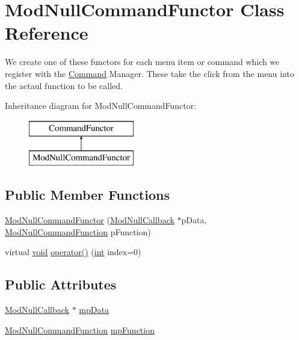 \hypertarget{class_mod_null_command_functor}{}\section{Mod\+Null\+Command\+Functor Class Reference}
\label{class_mod_null_command_functor}


We create one of these functors for each menu item or command which we register with the \hyperlink{class_command}{Command} Manager. These take the click from the menu into the actaul function to be called.  


Inheritance diagram for Mod\+Null\+Command\+Functor\+:\begin{figure}[H]
\begin{center}
\leavevmode
\includegraphics[height=2.000000cm]{class_mod_null_command_functor}
\end{center}
\end{figure}
\subsection*{Public Member Functions}
\begin{DoxyCompactItemize}
\item 
\hyperlink{class_mod_null_command_functor_a516fdbc18c6a0500cc85666d7cd2dd5f}{Mod\+Null\+Command\+Functor} (\hyperlink{class_mod_null_callback}{Mod\+Null\+Callback} $\ast$p\+Data, \hyperlink{_mod_null_callback_8cpp_a2613dba3762740ee26c9868d72c1e54b}{Mod\+Null\+Command\+Function} p\+Function)
\item 
virtual \hyperlink{sound_8c_ae35f5844602719cf66324f4de2a658b3}{void} \hyperlink{class_mod_null_command_functor_a0023affdcbcc704622f2ba172f8dac56}{operator()} (\hyperlink{xmltok_8h_a5a0d4a5641ce434f1d23533f2b2e6653}{int} index=0)
\end{DoxyCompactItemize}
\subsection*{Public Attributes}
\begin{DoxyCompactItemize}
\item 
\hyperlink{class_mod_null_callback}{Mod\+Null\+Callback} $\ast$ \hyperlink{class_mod_null_command_functor_a44efa1da46fe615acdd9548e17cad2c1}{mp\+Data}
\item 
\hyperlink{_mod_null_callback_8cpp_a2613dba3762740ee26c9868d72c1e54b}{Mod\+Null\+Command\+Function} \hyperlink{class_mod_null_command_functor_a93207c32fc725afcdb42f86d076dc490}{mp\+Function}
\end{DoxyCompactItemize}


